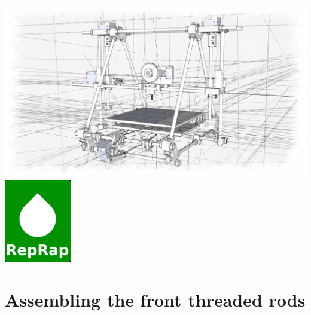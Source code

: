 \documentclass[twoside,openany,a4paper,titlepage]{memoir}
\begin{document}
	\begin{titlingpage}
		\begin{center}
			 \vspace{\baselineskip}
			 \vspace{\baselineskip}
			\includegraphics[width=1\linewidth]{graphics/prusa_cover.png} \vspace{\baselineskip}
			 \vspace{\baselineskip}\vspace{\baselineskip}
			\includegraphics[scale=0.32]{graphics/reprap_logo.png}
		\end{center}
	\end{titlingpage}

	\setcounter{tocdepth}{0}
	\tableofcontents

	\titlespacing*{\chapter}{0pt}{-20pt}{20pt}
	\pagestyle{reprap}
	
	

	\pagestyle{headings}
	\headsep=20pt
	
	
	\chapter{Assembling the front threaded rods}
\end{document}
